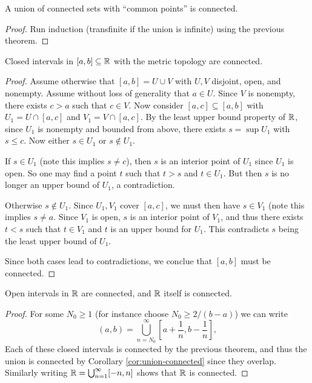 \begin{corollary}
  \label{cor:union-connected}
  A union of connected sets with
  ``common points'' is connected.
\end{corollary}

\begin{proof}
  Run induction (transfinite if the union is infinite)
  using the previous theorem.
\end{proof}

\begin{theorem}
  Closed intervals in $[a, b] \subseteq \mathbb{R}$
  with the metric topology are connected.
\end{theorem}

\begin{proof}
  Assume otherwise that $[a, b] = U \cup V$
  with $U, V$ disjoint, open, and nonempty.
  Assume without loss of generality that
  $a \in U$. Since $V$ is nonempty, there exists
  $c > a$ such that $c \in V$. Now consider
  $[a, c] \subseteq [a, b]$ with
  $U_1 = U \cap [a, c]$ and $V_1 = V \cap [a, c]$.
  By the least upper bound property of $\mathbb{R}$,
  since $U_1$ is nonempty and bounded from above,
  there exists $s = \sup U_1$ with
  $s \le c$. Now either $s \in U_1$ or $s \notin U_1$.

  If $s \in U_1$ (note this implies $s \ne c$), then $s$ is an interior point of
  $U_1$ since $U_1$ is open. So one may find
  a point $t$ such that $t > s$ and $t \in U_1$. But
  then $s$ is no longer an upper bound of $U_1$,
  a contradiction.

  Otherwise $s \notin U_1$. Since $U_1, V_1$
  cover $[a, c]$, we must then have $s \in V_1$ (note this implies $s \ne a$.
  Since $V_1$ is open, $s$ is an interior point
  of $V_1$, and thus there exists $t < s$
  such that $t \in V_1$ and $t$ is an upper bound for
  $U_1$. This contradicts $s$ being the
  least upper bound of $U_1$.

  Since both cases lead to contradictions, we
  conclue that $[a, b]$ must be connected.
\end{proof}

\begin{corollary}
  Open intervals in $\mathbb{R}$ are connected, and
  $\mathbb{R}$ itself is connected.
\end{corollary}

\begin{proof}
  For some $N_0 \ge 1$ (for instance choose
  $N_0 \ge 2 / (b - a)$) we can write
  \[
    (a, b) = \bigcup_{n = N_0}^\infty \left[a + \frac{1}{n}, b - \frac{1}{n}\right],
  \]
  Each of these closed intervals is connected by
  the previous theorem, and thus the union is connected
  by Corollary \ref{cor:union-connected} since
  they overlap.
  Similarly writing $\mathbb{R} = \bigcup_{n = 1}^\infty [-n, n]$
  shows that $\mathbb{R}$ is connected.
\end{proof}


